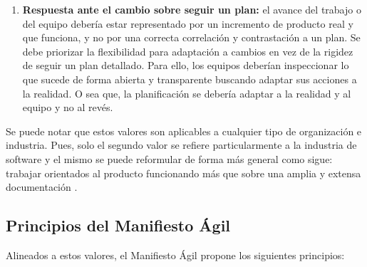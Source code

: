 \begin{enumerate}
\item \textbf{Respuesta ante el cambio sobre seguir un plan:} el avance del trabajo o del equipo debería estar representado por un incremento de producto real y que funciona, y no por una correcta correlación y contrastación a un plan. Se debe priorizar la flexibilidad para adaptación a cambios en vez de la rigidez de seguir un plan detallado. Para ello, los equipos deberían inspeccionar lo que sucede de forma abierta y transparente buscando adaptar sus acciones a la realidad. O sea que, la planificación se debería adaptar a la realidad y al equipo y no al revés.

\end{enumerate}

Se puede notar que estos valores son aplicables a cualquier tipo de organización e industria. Pues, solo el segundo valor se refiere particularmente a la industria de software y el mismo se puede reformular de forma más general como sigue: trabajar orientados al producto funcionando más que sobre una amplia y extensa documentación \cite{Sriram-Narayan-2015}.

\subsection{Principios del Manifiesto Ágil}

Alineados a estos valores, el Manifiesto Ágil propone los siguientes principios:

